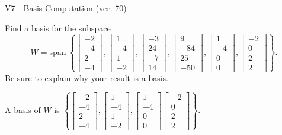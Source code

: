 \begin{exercise}
  \begin{exerciseTitle}V7 - Basis Computation (ver. 70)\end{exerciseTitle}
  \begin{exerciseStatement}
    Find a basis for the subspace 
\[W=\mathrm{span}\ \left\{\left[\begin{array}{r}
-2 \\
-4 \\
2 \\
-4
\end{array}\right] , \left[\begin{array}{r}
1 \\
-4 \\
1 \\
-2
\end{array}\right] , \left[\begin{array}{r}
-3 \\
24 \\
-7 \\
14
\end{array}\right] , \left[\begin{array}{r}
9 \\
-84 \\
25 \\
-50
\end{array}\right] , \left[\begin{array}{r}
1 \\
-4 \\
0 \\
0
\end{array}\right] , \left[\begin{array}{r}
-2 \\
0 \\
2 \\
2
\end{array}\right]\right\}.\]
 Be sure to explain why your result is a basis.


  \end{exerciseStatement}
  \begin{exerciseAnswer}
   A basis of \(W\) is  \(\left\{\left[\begin{array}{r}
-2 \\
-4 \\
2 \\
-4
\end{array}\right] , \left[\begin{array}{r}
1 \\
-4 \\
1 \\
-2
\end{array}\right] , \left[\begin{array}{r}
1 \\
-4 \\
0 \\
0
\end{array}\right] \left[\begin{array}{r}
-2 \\
0 \\
2 \\
2
\end{array}\right]\right\}\).
  


  \end{exerciseAnswer}
\end{exercise}